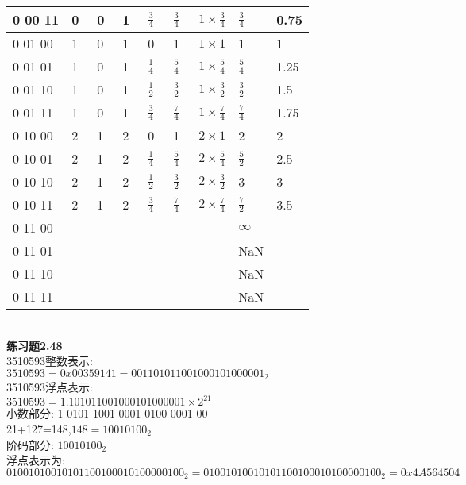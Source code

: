 \documentclass{article}
\begin{document}
\begin{CJK}{UTF8}{uyhei}
\begin{table}[ht]
\begin{tabular}{|m{5em}<{\centering}|m{5em}<{\centering}|m{5em}<{\centering}|m{5em}<{\centering}|m{5em}<{\centering}|m{5em}<{\centering}|m{5em}<{\centering}|m{5em}<{\centering}|m{5em}<{\centering}|}
	\hline
	0 00 11	&	0	&	0	&	1	&	$\frac{3}{4}$	&	$\frac{3}{4}$	&	$1\times \frac{3}{4}$	&	$\frac{3}{4}$	&	0.75	\\
	\hline
	0 01 00	&	1	&	0	&	1	&	0	&	1	&	$1\times 1$	&	1	&	1	\\
	\hline
	0 01 01	&	1	&	0	&	1	&	$\frac{1}{4}$	&	$\frac{5}{4}$	&	$1\times \frac{5}{4}$	&	$\frac{5}{4}$	&	1.25	\\
	\hline
	0 01 10	&	1	&	0	&	1	&	$\frac{1}{2}$	&	$\frac{3}{2}$	&	$1\times \frac{3}{2}$	&	$\frac{3}{2}$	&	1.5	\\
	\hline
	0 01 11	&	1	&	0	&	1	&	$\frac{3}{4}$	&	$\frac{7}{4}$	&	$1\times \frac{7}{4}$	&	$\frac{7}{4}$	&	1.75	\\
	\hline
	0 10 00	&	2	&	1	&	2	&	0	&	1	&	$2\times 1$	&	2	&	2	\\
	\hline
	0 10 01	&	2	&	1	&	2	&	$\frac{1}{4}$	&	$\frac{5}{4}$	&	$2\times \frac{5}{4}$	&	$\frac{5}{2}$	&	2.5	\\
	\hline
	0 10 10	&	2	&	1	&	2	&	$\frac{1}{2}$	&	$\frac{3}{2}$	&	$2\times \frac{3}{2}$	&	3	&	3	\\
	\hline
	0 10 11	&	2	&	1	&	2	&	$\frac{3}{4}$	&	$\frac{7}{4}$	&	$2\times \frac{7}{4}$	&	$\frac{7}{2}$	&	3.5	\\
	\hline
	0 11 00	&	---	&	---	&	---	&	---	&	---	&	---	&	$\infty$	&	---	\\
	\hline
	0 11 01	&	---	&	---	&	---	&	---	&	---	&	---	&	NaN	&	---	\\
	\hline
	0 11 10	&	---	&	---	&	---	&	---	&	---	&	---	&	NaN	&	---	\\
	\hline
	0 11 11	&	---	&	---	&	---	&	---	&	---	&	---	&	NaN	&	---	\\
	\hline
\end{tabular}
\end{table}	\\
\textbf{练习题2.48}	\\[2ex]
3510593整数表示:	\\
$3510593=0x00359141=0011 0101 1001 0001 0100 0001_2$	\\[2ex]
3510593浮点表示:	\\
$3510593=1.1 0101 1001 0001 0100 0001\times 2^{21}$	\\
小数部分: 1 0101 1001 0001 0100 0001 00	\\[2ex]
21+127=148,$148=1001 0100_2$	\\
阶码部分: $10010100_2$	\\[2ex]
浮点表示为: $0 10010100 1 0101 1001 0001 0100 0001 00_2=0100 1010 0101 0110 0100 0101 0000 0100_2=0x4A564504$	\\

\end{CJK}
\end{document}
